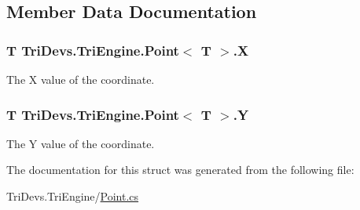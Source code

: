 \subsection{Member Data Documentation}
\hypertarget{struct_tri_devs_1_1_tri_engine_1_1_point_3_01_t_01_4_a6cf67ed6637a21f67470f388f0b4fe74}{
\subsubsection[{X}]{\setlength{\rightskip}{0pt plus 5cm}T Tri\-Devs.\-Tri\-Engine.\-Point$<$ T $>$.X}}\label{struct_tri_devs_1_1_tri_engine_1_1_point_3_01_t_01_4_a6cf67ed6637a21f67470f388f0b4fe74}


The X value of the coordinate. 

\hypertarget{struct_tri_devs_1_1_tri_engine_1_1_point_3_01_t_01_4_a1af61f477e5af56a1add14b354d8795a}{
\subsubsection[{Y}]{\setlength{\rightskip}{0pt plus 5cm}T Tri\-Devs.\-Tri\-Engine.\-Point$<$ T $>$.Y}}\label{struct_tri_devs_1_1_tri_engine_1_1_point_3_01_t_01_4_a1af61f477e5af56a1add14b354d8795a}


The Y value of the coordinate. 



The documentation for this struct was generated from the following file\-:\begin{DoxyCompactItemize}
\item 
Tri\-Devs.\-Tri\-Engine/\hyperlink{_point_8cs}{Point.\-cs}\end{DoxyCompactItemize}
